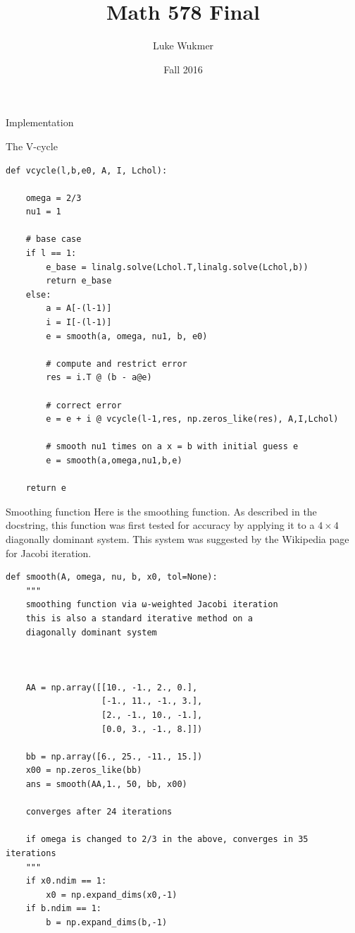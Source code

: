 \documentclass[10pt]{article}
\theoremstyle{definition}
\begin{document}
\title{Math 578 Final}
\author{Luke Wukmer}
\date{Fall 2016}
\maketitle \thispagestyle{empty} %

\begin{section}{Implementation}

\begin{subsection}{The V-cycle}
\begin{lstlisting}
def vcycle(l,b,e0, A, I, Lchol):
    
    omega = 2/3
    nu1 = 1

    # base case
    if l == 1:
        e_base = linalg.solve(Lchol.T,linalg.solve(Lchol,b))
        return e_base
    else:
        a = A[-(l-1)]
        i = I[-(l-1)]
        e = smooth(a, omega, nu1, b, e0)

        # compute and restrict error
        res = i.T @ (b - a@e)

        # correct error
        e = e + i @ vcycle(l-1,res, np.zeros_like(res), A,I,Lchol)
         
        # smooth nu1 times on a x = b with initial guess e
        e = smooth(a,omega,nu1,b,e)

    return e
\end{lstlisting}
\end{subsection}
\begin{subsection}{Smoothing function}
Here is the smoothing function. As described in the docstring, this function was first tested for accuracy by applying it to a $4\times4$ diagonally dominant system. This system was suggested by the Wikipedia page for Jacobi iteration.
\begin{lstlisting}
def smooth(A, omega, nu, b, x0, tol=None):
    """
    smoothing function via ω-weighted Jacobi iteration
    this is also a standard iterative method on a
    diagonally dominant system



    AA = np.array([[10., -1., 2., 0.],
                   [-1., 11., -1., 3.],
                   [2., -1., 10., -1.],
                   [0.0, 3., -1., 8.]])

    bb = np.array([6., 25., -11., 15.])
    x00 = np.zeros_like(bb)
    ans = smooth(AA,1., 50, bb, x00)

    converges after 24 iterations
    
    if omega is changed to 2/3 in the above, converges in 35 iterations
    """
    if x0.ndim == 1:
        x0 = np.expand_dims(x0,-1)
    if b.ndim == 1:
        b = np.expand_dims(b,-1)
    

\end{lstlisting}
\end{subsection}
\end{section}
\end{document}
